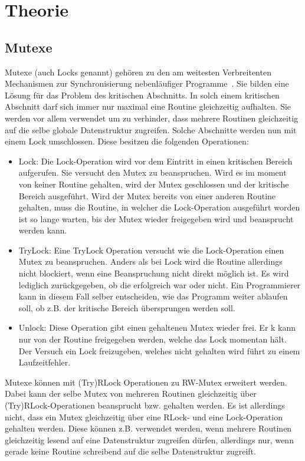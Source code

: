 \chapter{Theorie}\label{chap:background}

\section{Mutexe}\label{Chap:Back-Sec:Mutex}
Mutexe (auch Locks genannt) gehören zu den am weitesten Verbreitenten Mechanismen 
zur Synchronisierung nebenläufiger Programme~\cite{Undead}. Sie bilden 
eine Lösung für das Problem des kritischen Abschnitts. In solch einem 
kritischen Abschnitt darf sich immer nur maximal eine Routine gleichzeitig
aufhalten. Sie werden vor allem verwendet um zu verhinder, dass 
mehrere Routinen gleichzeitig auf die selbe globale Datenstruktur 
zugreifen. Solche Abschnitte werden nun mit einem Lock umschlossen. 
Diese besitzen die folgenden Operationen:
\begin{itemize}
  \item Lock: Die Lock-Operation wird vor dem Eintritt in einen kritischen 
    Bereich aufgerufen. Sie versucht den Mutex zu beanspruchen. Wird es im moment
    von keiner Routine gehalten, wird der Mutex geschlossen und der kritische
    Bereich ausgeführt. Wird der Mutex bereits von einer anderen Routine 
    gehalten, muss die Routine, in welcher die Lock-Operation ausgeführt 
    worden ist so lange warten, bis der Mutex wieder freigegeben wird und 
    beansprucht werden kann.
  \item TryLock: Eine TryLock Operation versucht wie die Lock-Operation 
    einen Mutex zu beanspruchen. Anders als bei Lock wird die Routine allerdings 
    nicht blockiert, wenn eine Beanspruchung nicht direkt möglich ist. Es wird 
    lediglich zurückgegeben, ob die erfolgreich war oder nicht. Ein Programmierer 
    kann in diesem Fall selber entscheiden, wie das Programm weiter ablaufen 
    soll, ob z.B. der kritische Bereich übersprungen werden soll.
  \item Unlock: Diese Operation gibt einen gehaltenen Mutex wieder frei. Er k
    kann nur von der Routine freigegeben werden, welche das Lock momentan
    hält. Der Versuch ein Lock freizugeben, welches nicht gehalten wird führt 
    zu einem Laufzeitfehler. 
\end{itemize}
Mutexe können mit (Try)RLock Operationen zu RW-Mutex erweitert werden.
Dabei kann der selbe Mutex von mehreren Routinen gleichzeitig über 
(Try)RLock-Operationen beansprucht bzw. gehalten werden. Es ist allerdings 
nicht, dass ein Mutex gleichzeitig über eine RLock- und eine Lock-Operation 
gehalten werden. Diese können z.B. verwendet werden, wenn mehrere Routinen 
gleichzeitig lesend auf eine Datenstruktur zugreifen dürfen, allerdings nur, 
wenn gerade keine Routine schreibend auf die selbe Datenstruktur zugreift.


